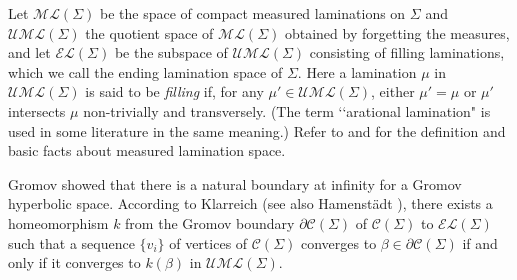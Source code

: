 \documentclass{amsart}
\theoremstyle{definition}
\numberwithin{figure}{section}
\numberwithin{equation}{section}
\newcommand{\blackboard}[1]{\ensuremath{\mathbb{#1}}}
\newcommand{\complexes}{\blackboard{C}}
\def\cc{\complexes}
\def\cc{\mathcal{C}}
\def\part{\partial}
\begin{document}
Let $\mathcal{ML}(\Sigma)$ be the space of compact measured laminations on $\Sigma$ and $\mathcal{UML}(\Sigma)$ the quotient space of $\mathcal{ML}(\Sigma)$ obtained by forgetting the measures, and 
let $\mathcal{EL}(\Sigma)$ be the subspace of $\mathcal{UML}(\Sigma)$ consisting of filling laminations, which we call the ending lamination space of $\Sigma$.
Here a lamination $\mu$ in $\mathcal{UML}(\Sigma)$ is said to be \emph{filling} if, for any $\mu'\in \mathcal{UML}(\Sigma)$, either $\mu'=\mu$ or $\mu'$ intersects $\mu$ non-trivially and transversely.
(The term \lq \lq arational lamination" is used in some literature in the same meaning.)
Refer to \cite{flp} and \cite{bc} for the definition and basic facts about measured lamination space.

Gromov showed that there is a natural boundary at infinity for a Gromov hyperbolic space.
According to Klarreich \cite{kla} (see also Hamenst\"{a}dt \cite{ham}), there exists a homeomorphism $k$ from the 
Gromov boundary $\part \cc(\Sigma)$ of $\cc(\Sigma)$ to $\mathcal{EL}(\Sigma)$ such that a sequence $\{v_i\}$ of vertices 
of $\cc(\Sigma)$ converges to $\beta \in \part \cc(\Sigma)$ if and only if it converges to $k(\beta)$ in $\mathcal{UML}(\Sigma)$.
\end{document}
